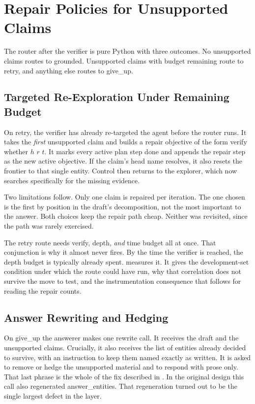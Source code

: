\section{Repair Policies for Unsupported Claims}\label{sec:repair}

The router after the verifier is pure Python with three outcomes. No unsupported
claims routes to \textsf{grounded}. Unsupported claims with budget remaining
route to \textsf{retry}, and anything else routes to \textsf{give\_up}.

\subsection{Targeted Re-Exploration Under Remaining Budget}

On \textsf{retry}, the verifier has already re-targeted
the agent before the router runs. It takes the
\emph{first} unsupported claim and builds a repair objective of the form \textsf{verify whether $h$ $r$ $t$}. It marks every
active plan step done and appends the repair step as the new active objective.
If the claim's head name resolves, it also resets the frontier to that single
entity. Control then returns to the explorer, which now searches specifically
for the missing evidence.

Two limitations follow. Only one claim is repaired per iteration. The one chosen
is the first by position in the draft's decomposition, not the most important to
the answer. Both choices keep the repair path cheap. Neither was revisited,
since the path was rarely exercised.

The retry route needs verify, depth, \emph{and} time budget all at once. That
conjunction is why it almost never fires. By the time the verifier is reached,
the depth budget is typically already spent.  measures
it. It gives the development-set condition under which the route could have run,
why that correlation does not survive the move to test, and the instrumentation
consequence that follows for reading the repair counts.

\subsection{Answer Rewriting and Hedging}

On \textsf{give\_up} the answerer makes one rewrite call. It receives the draft
and the unsupported claims. Crucially, it also receives the list of entities
already decided to survive, with an instruction to keep them named exactly as
written. It is asked to remove or hedge the unsupported material and to respond
with prose only. That last phrase is the whole of the fix described in
. In the original design this call also regenerated
\textsf{answer\_entities}. That regeneration turned out to be the single largest
defect in the layer.


